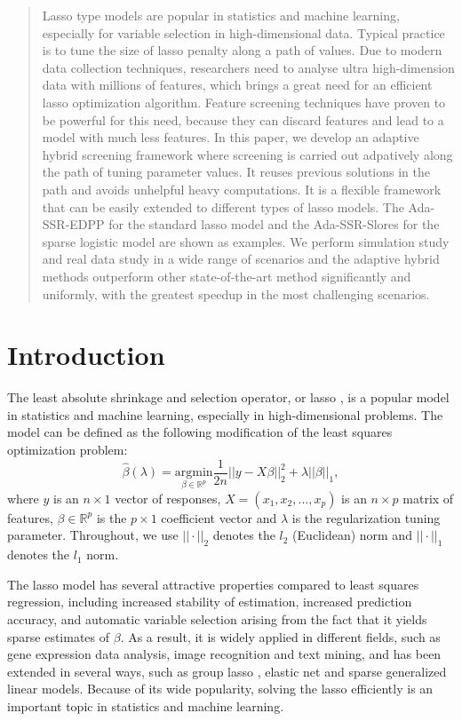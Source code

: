 
\begin{abstract}
    Lasso type models are popular in statistics and machine learning, especially for variable selection in high-dimensional data. Typical practice is to tune the size of lasso penalty along a path of values. Due to modern data collection techniques, researchers need to analyse ultra high-dimension data with millions of features, which brings a great need for an efficient lasso optimization algorithm. Feature screening techniques have proven to be powerful for this need, because they can discard features and lead to a model with much less features. In this paper, we develop an adaptive hybrid screening framework where screening is carried out adpatively along the path of tuning parameter values. It reuses previous solutions in the path and avoids unhelpful heavy computations. It is a flexible framework that can be easily extended to different types of lasso models. The Ada-SSR-EDPP for the standard lasso model and the Ada-SSR-Slores for the sparse logistic model are shown as examples. We perform simulation study and real data study in a wide range of scenarios and the adaptive hybrid methods outperform other state-of-the-art method significantly and uniformly, with the greatest speedup in the most challenging scenarios.
\end{abstract}

\section{Introduction}

The least absolute shrinkage and selection operator, or lasso \citep{tibshirani1996regression}, is a popular model in statistics and machine learning, especially in high-dimensional problems. The model can be defined as the following modification of the least squares optimization problem:
\begin{equation}
    \hat{\beta}(\lambda)=\underset{\beta\in \mathbb{R}^p}{\mathrm{argmin}}\frac{1}{2n}||y-X\beta||_2^2+\lambda||\beta||_1,
\end{equation}
where $y$ is an $n\times 1$ vector of responses, $X=(x_1,x_2,...,x_p)$ is an $n\times p$ matrix of features, $\beta\in \mathbb{R}^p$ is the $p\times 1$ coefficient vector and $\lambda$ is the regularization tuning parameter. Throughout, we use $||\cdot||_2$ denotes the $l_2$ (Euclidean) norm and $||\cdot||_1$ denotes the $l_1$ norm. 

The lasso model has several attractive properties compared to least squares regression, including increased stability of estimation, increased prediction accuracy, and automatic variable selection arising from the fact that it yields sparse estimates of $\beta$.  As a result, it is widely applied in different fields, such as gene expression data analysis, image recognition and text mining, and has been extended in several ways, such as group lasso \citep{yuan2006model}, elastic net \citep{zou2005regularization} and sparse generalized linear models. Because of its wide popularity, solving the lasso efficiently is an important topic in statistics and machine learning.

